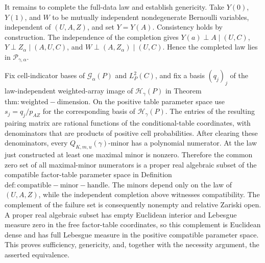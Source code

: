 It remains to complete the full-data law and establish genericity. Take \(Y(0)\), \(Y(1)\), and \(W\) to be mutually independent nondegenerate Bernoulli variables, independent of \((U,A,Z)\), and set \(Y=Y(A)\). Consistency holds by construction. The independence of the completion gives \(Y(a)\perp A\mid(U,C)\), \(Y\perp Z_\alpha\mid(A,U,C)\), and \(W\perp(A,Z_\alpha)\mid(U,C)\). Hence the completed law lies in \(\mathcal P_{\gamma,\alpha}\).

Fix cell-indicator bases of \(\mathcal G_\alpha(P)\) and \(L_P^2(C)\), and fix a basis \((q_j)_j\) of the law-independent weighted-array image of \(\mathcal H_\gamma(P)\) in Theorem \(\mathrm{thm:weighted-dimension}\). On the positive table parameter space use \(s_j=q_j/p_{AZ}\) for the corresponding basis of \(\mathcal H_\gamma(P)\). The entries of the resulting pairing matrix are rational functions of the conditional-table coordinates, with denominators that are products of positive cell probabilities. After clearing these denominators, every \(Q_{K,m,u}(\gamma)\)-minor has a polynomial numerator. At the law just constructed at least one maximal minor is nonzero. Therefore the common zero set of all maximal-minor numerators is a proper real algebraic subset of the compatible factor-table parameter space in Definition \(\mathrm{def:compatible-minor-handle}\). The minors depend only on the law of \((U,A,Z)\), while the independent completion above witnesses compatibility. The complement of the failure set is consequently nonempty and relative Zariski open. A proper real algebraic subset has empty Euclidean interior and Lebesgue measure zero in the free factor-table coordinates, so this complement is Euclidean dense and has full Lebesgue measure in the positive compatible parameter space. This proves sufficiency, genericity, and, together with the necessity argument, the asserted equivalence.